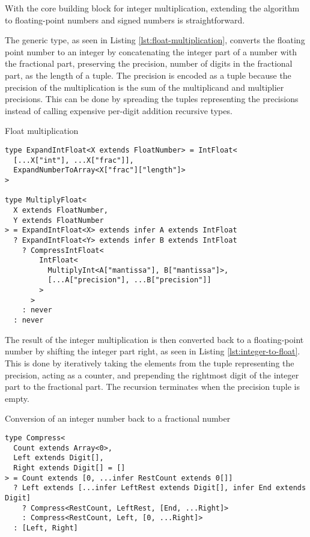 With the core building block for integer multiplication, extending the algorithm to floating-point numbers and signed numbers is straightforward.

The  generic type, as seen in Listing \ref{lst:float-multiplication}, converts the floating point number to an integer by concatenating the integer part of a number with the fractional part, preserving the precision, number of digits in the fractional part, as the length of a tuple. The precision is encoded as a tuple because the precision of the multiplication is the sum of the multiplicand and multiplier precisions. This can be done by spreading the tuples representing the precisions instead of calling expensive per-digit addition recursive types.

\begin{listing}[ht]
  \caption{Float multiplication}\label{lst:float-multiplication}
  \begin{verbatim}
type ExpandIntFloat<X extends FloatNumber> = IntFloat<
  [...X["int"], ...X["frac"]],
  ExpandNumberToArray<X["frac"]["length"]>
>

type MultiplyFloat<
  X extends FloatNumber,
  Y extends FloatNumber
> = ExpandIntFloat<X> extends infer A extends IntFloat
  ? ExpandIntFloat<Y> extends infer B extends IntFloat
    ? CompressIntFloat<
        IntFloat<
          MultiplyInt<A["mantissa"], B["mantissa"]>,
          [...A["precision"], ...B["precision"]]
        >
      >
    : never
  : never
\end{verbatim}
\end{listing}

The result of the integer multiplication is then converted back to a floating-point number by shifting the integer part right, as seen in Listing \ref{lst:integer-to-float}. This is done by iteratively taking the elements from the tuple representing the precision, acting as a counter, and prepending the rightmost digit of the integer part to the fractional part. The recursion terminates when the precision tuple is empty.

\begin{listing}[ht]
  \caption{Conversion of an integer number back to a fractional number}\label{lst:integer-to-float}
  \begin{verbatim}
type Compress<
  Count extends Array<0>,
  Left extends Digit[],
  Right extends Digit[] = []
> = Count extends [0, ...infer RestCount extends 0[]]
  ? Left extends [...infer LeftRest extends Digit[], infer End extends Digit]
    ? Compress<RestCount, LeftRest, [End, ...Right]>
    : Compress<RestCount, Left, [0, ...Right]>
  : [Left, Right]
\end{verbatim}
\end{listing}
